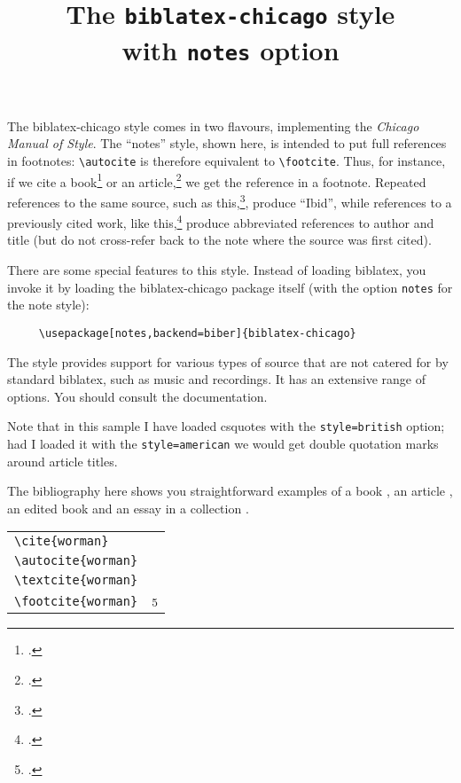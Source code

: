 \documentclass{article}
\begin{document}
\title{The \texttt{biblatex-chicago} style\\with \texttt{notes} option}
\author{}\date{}
\maketitle

\thispagestyle{empty}\pagestyle{empty}

The \textsf{biblatex-chicago} style comes in two flavours, implementing the \emph{Chicago Manual of Style}. The \enquote{notes} style, shown here, is intended to put full references in footnotes: \verb|\autocite| is therefore equivalent to \verb|\footcite|. Thus, for instance, if we cite a book\footcite{worman} or an article,\footcite{reese} we get the reference in a footnote. Repeated references to the same source, such as this,\footcite{reese}, produce \enquote{Ibid}, while references to a previously cited work, like this,\footcite{worman} produce abbreviated references to author and title (but do not cross-refer back to the note where the source was first cited).

There are some special features to this style. Instead of loading \textsf{biblatex}, you invoke it by loading the \textsf{biblatex-chicago} package itself (with the option \verb|notes| for the note style):
\begin{verbatim}
     \usepackage[notes,backend=biber]{biblatex-chicago}
\end{verbatim}
The style provides support for various types of source that are not catered for by standard \textsf{biblatex}, such as music and recordings. It has an extensive range of options. You should consult the documentation.

Note that in this sample I have loaded \textsf{csquotes} with the \verb~style=british~ option; had I loaded it with the \verb~style=american~ we would get double quotation marks around article titles.

The bibliography here shows you straightforward examples of a book \autocite{worman}, an article \autocite{reese}, an edited book \autocite{aristotle:anima} and an essay in a collection \autocite{gaonkar:in}.

\medskip

\begin{tabular}{ll}
\verb|\cite{worman}| & \cite{worman} \\
\verb|\autocite{worman}| & \strut\autocite{worman} \\
\verb|\textcite{worman}| & \textcite{worman} \\
\verb|\footcite{worman}| & \strut\footcite{worman}
\end{tabular}

\printbibliography
\end{document}
